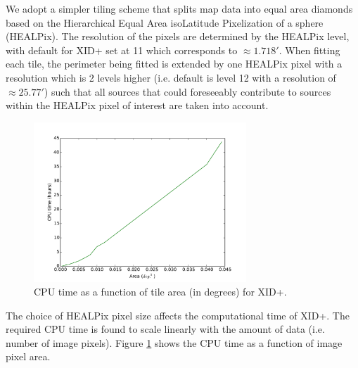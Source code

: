 \documentclass[useAMS,usenatbib]{mnras}
\begin{document}
%
%
We adopt a simpler tiling scheme that splits map data into equal area diamonds based on the Hierarchical Equal Area isoLatitude Pixelization of a sphere (HEALPix). The resolution of the pixels are determined by the HEALPix level, with default for \textsc{XID+} set at 11 which corresponds to $\approx 1.718'$. When fitting each tile, the perimeter being fitted is extended by one HEALPix pixel with a resolution which is 2 levels higher (i.e. default is level 12 with a resolution of $\approx 25.77'$) such that all sources that could foreseeably contribute to sources within the HEALPix pixel of interest are taken into account. 

\begin{figure} 
\includegraphics[width=8cm]{profiletest.pdf}
\caption{CPU time as a function of tile area (in degrees) for \textsc{XID+}. }\label{fig:prof}
\end{figure}

The choice of HEALPix pixel size affects the computational time of \textsc{XID+}. The required CPU time is found to scale linearly with the amount of data (i.e. number of image pixels). Figure \ref{fig:prof} shows the CPU time as a function of image pixel area.
\end{document}
